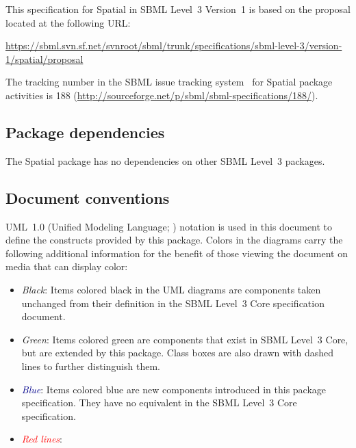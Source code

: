 This specification for Spatial in SBML Level~3 Version~1 is based on the proposal located at the following URL:

\begin{center}
  \vspace*{1ex}\small
  \url{https://sbml.svn.sf.net/svnroot/sbml/trunk/specifications/sbml-level-3/version-1/spatial/proposal}
  \vspace*{1ex}
\end{center}

The tracking number in the SBML issue tracking system~\citep{tracker} for Spatial package activities is 188 (\url{http://sourceforge.net/p/sbml/sbml-specifications/188/}).


\subsection{Package dependencies}

The Spatial package has no dependencies on other SBML Level~3 packages.


\subsection{Document conventions}
\label{conventions}

UML~1.0 (Unified Modeling Language; \citealt{eriksson:1998, oestereich:1999}) notation is used in this document to define the constructs provided by this package.  Colors in the diagrams carry the following additional information for the benefit of those viewing the document on media that can display color:

\begin{itemize}

\item[\raisebox{2.75pt}{\colorbox{black}{\rule{0.8pt}{0.8pt}}}]
  \emph{Black}: Items colored black in the UML diagrams are components
  taken unchanged from their definition in the SBML Level~3 Core
  specification document.

\item[\raisebox{2.75pt}{\colorbox{mediumgreen}{\rule{0.8pt}{0.8pt}}}]
  \emph{\textcolor{mediumgreen}{Green}}: Items colored green are
  components that exist in SBML Level~3 Core, but are extended by this
  package.  Class boxes are also drawn with dashed lines to further
  distinguish them.

\item[\raisebox{2.75pt}{\colorbox{darkblue}{\rule{0.8pt}{0.8pt}}}]
  \emph{\textcolor{darkblue}{Blue}}: Items colored blue are new
  components introduced in this package specification.  They have no
  equivalent in the SBML Level~3 Core specification.

\item[\raisebox{2.75pt}{\colorbox{red}{\rule{0.8pt}{0.8pt}}}]
  \emph{\textcolor{red}{Red lines}}: 

\end{itemize}

